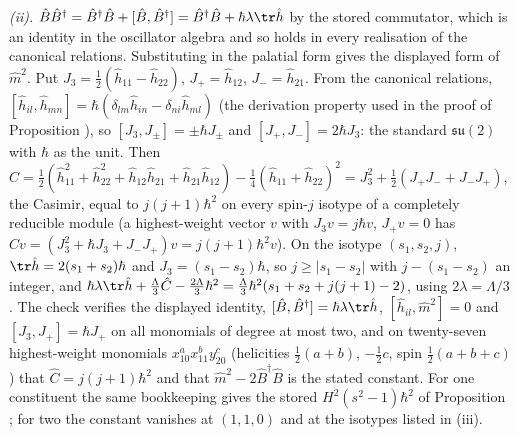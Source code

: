 \emph{(ii).} $\hat{B}\hat{B}^{\dagger} = \hat{B}^{\dagger}\hat{B} + [\hat{B}, \hat{B}^{\dagger}] = \hat{B}^{\dagger}\hat{B} + \hbar\lambda\tr\hat{h}$ by the stored commutator, which is an identity in the oscillator algebra and so holds in every realisation of the canonical relations. Substituting in the palatial form gives the displayed form of $\hat{m}^{2}$. Put $J_{3} = \tfrac12(\hat{h}_{11} - \hat{h}_{22})$, $J_{+} = \hat{h}_{12}$, $J_{-} = \hat{h}_{21}$. From the canonical relations, $[\hat{h}_{il}, \hat{h}_{mn}] = \hbar(\delta_{lm}\hat{h}_{in} - \delta_{ni}\hat{h}_{ml})$ (the derivation property used in the proof of Proposition ), so $[J_{3}, J_{\pm}] = \pm\hbar J_{\pm}$ and $[J_{+}, J_{-}] = 2\hbar J_{3}$: the standard $\mathfrak{su}(2)$ with $\hbar$ as the unit. Then $\hat{C} = \tfrac12(\hat{h}_{11}^{2} + \hat{h}_{22}^{2} + \hat{h}_{12}\hat{h}_{21} + \hat{h}_{21}\hat{h}_{12}) - \tfrac14(\hat{h}_{11} + \hat{h}_{22})^{2} = J_{3}^{2} + \tfrac12(J_{+}J_{-} + J_{-}J_{+})$, the Casimir, equal to $j(j+1)\hbar^{2}$ on every spin-$j$ isotype of a completely reducible module (a highest-weight vector $v$ with $J_{3}v = j\hbar v$, $J_{+}v = 0$ has $\hat{C}v = (J_{3}^{2} + \hbar J_{3} + J_{-}J_{+})v = j(j+1)\hbar^{2}v$). On the isotype $(s_{1}, s_{2}, j)$, $\tr\hat{h} = 2(s_{1} + s_{2})\hbar$ and $J_{3} = (s_{1} - s_{2})\hbar$, so $j \ge |s_{1} - s_{2}|$ with $j - (s_{1} - s_{2})$ an integer, and $\hbar\lambda\tr\hat{h} + \tfrac{\Lambda}{3}\hat{C} - \tfrac{2\Lambda}{3}\hbar^{2} = \tfrac{\Lambda}{3}\hbar^{2}(s_{1} + s_{2} + j(j+1) - 2)$, using $2\lambda = \Lambda/3$. The check verifies the displayed identity, $[\hat{B}, \hat{B}^{\dagger}] = \hbar\lambda\tr\hat{h}$, $[\hat{h}_{il}, \hat{m}^{2}] = 0$ and $[J_{3}, J_{+}] = \hbar J_{+}$ on all monomials of degree at most two, and on twenty-seven highest-weight monomials $x_{10}^{a}x_{11}^{b}y_{20}^{c}$ (helicities $\tfrac12(a+b)$, $-\tfrac12 c$, spin $\tfrac12(a+b+c)$) that $\hat{C} = j(j+1)\hbar^{2}$ and that $\hat{m}^{2} - 2\hat{B}^{\dagger}\hat{B}$ is the stated constant. For one constituent the same bookkeeping gives the stored $H^{2}(s^{2} - 1)\hbar^{2}$ of Proposition ; for two the constant vanishes at $(1, 1, 0)$ and at the isotypes listed in (iii).

